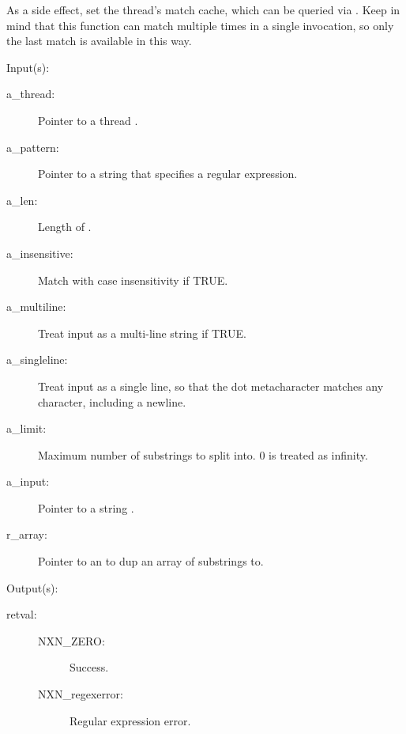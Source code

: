 \begin{capi}
\begin{capilist}
		As a side effect, set the thread's match cache, which can be
		queried via .  Keep in mind that
		this function can match multiple times in a single invocation,
		so only the last match is available in this way.
	\end{capilist}
\label{nxo_regex_nonew_split}
	\begin{capilist}
	\item[Input(s): ]
		\begin{description}\item[]
		\item[a\_thread: ]
			Pointer to a thread .
		\item[a\_pattern: ]
			Pointer to a string that specifies a regular expression.
		\item[a\_len: ]
			Length of .
		\item[a\_insensitive: ]
			Match with case insensitivity if TRUE.
		\item[a\_multiline: ]
			Treat input as a multi-line string if TRUE.
		\item[a\_singleline: ]
			Treat input as a single line, so that the dot
			metacharacter matches any character, including a
			newline.
		\item[a\_limit: ]
			Maximum number of substrings to split 
			into.  0 is treated as infinity.
		\item[a\_input: ]
			Pointer to a string .
		\item[r\_array: ]
			Pointer to an  to dup an array of
			substrings to.
		\end{description}
	\item[Output(s): ]
		\begin{description}\item[]
		\item[retval: ]
			\begin{description}\item[]
			\item[NXN\_ZERO: ] Success.
			\item[NXN\_regexerror: ] Regular expression error.
			\end{description}

\end{description}
\end{capilist}
\end{capi}
